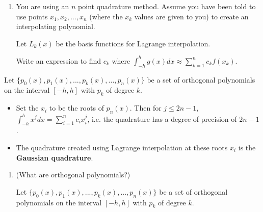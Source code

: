 \documentclass[12pt,letterpaper,noanswers]{exam}
\begin{document}
\begin{enumerate}[resume=classQ]
\item You are using an $n$ point quadrature method.  Assume you have been told to use points $x_1, x_2, ..., x_n$ (where the $x_k$ values are given to you) to create an interpolating polynomial.

Let $L_k(x)$ be the basis functions for Lagrange interpolation.  

Write an expression to find $c_k$ where $\displaystyle\int_{-h}^h g(x) dx \approx \sum\limits_{k=1}^n c_k f(x_k)$.
\vspace{1in}

\end{enumerate}
\begin{tcolorbox}
Let $\{p_0(x),p_1(x),...,p_k(x),...,p_n(x)\}$ be a set of orthogonal polynomials on the interval $[-h,h]$ with $p_k$ of degree $k$.
\begin{itemize}
\itemsep0pt
    \item Set the $x_i$ to be the roots of $p_n(x)$. Then for $j\leq 2n-1$, $\displaystyle \int_{-h}^h x^j dx = \sum\limits_{i=1}^n c_i x_i^j$, i.e. the quadrature has a degree of precision of $2n-1$.
    \item The quadrature created using Lagrange interpolation at these roots $x_i$ is the \textbf{Gaussian quadrature}.
\end{itemize}


\end{tcolorbox}
\begin{enumerate}[resume=classQ]
\item %

(What are orthogonal polynomials?)

Let $\{p_0(x),p_1(x),...,p_k(x),...,p_n(x)\}$ be a set of orthogonal polynomials on the interval $[-h,h]$ with $p_k$ of degree $k$.
\end{enumerate}
\end{document}
